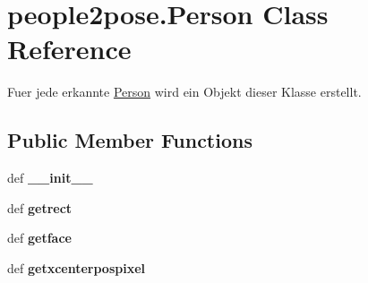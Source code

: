 \hypertarget{classpeople2pose_1_1Person}{\section{people2pose.\-Person Class Reference}
\label{classpeople2pose_1_1Person}
}


Fuer jede erkannte \hyperlink{classpeople2pose_1_1Person}{Person} wird ein Objekt dieser Klasse erstellt.  


\subsection*{Public Member Functions}
\begin{DoxyCompactItemize}
\item 
\hypertarget{classpeople2pose_1_1Person_a150aa3205bf2b4c4b75ee8cf6ff1b010}{def {\bfseries \-\_\-\-\_\-init\-\_\-\-\_\-}}\label{classpeople2pose_1_1Person_a150aa3205bf2b4c4b75ee8cf6ff1b010}

\item 
\hypertarget{classpeople2pose_1_1Person_a1cee16a845cd88111992599d6ef6020f}{def {\bfseries getrect}}\label{classpeople2pose_1_1Person_a1cee16a845cd88111992599d6ef6020f}

\item 
\hypertarget{classpeople2pose_1_1Person_a1579845b5d9e5eb1631e4a47391b1a83}{def {\bfseries getface}}\label{classpeople2pose_1_1Person_a1579845b5d9e5eb1631e4a47391b1a83}

\item 
\hypertarget{classpeople2pose_1_1Person_ad63251e6511495e141bfb468fbd5a44a}{def {\bfseries getxcenterpospixel}}\label{classpeople2pose_1_1Person_ad63251e6511495e141bfb468fbd5a44a}

\end{DoxyCompactItemize}
